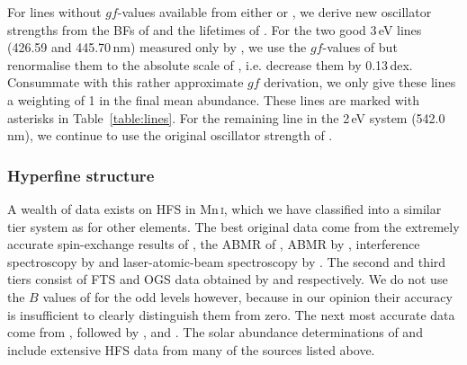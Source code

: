 \documentclass[traditabstract]{aa}
\begin{document}
For lines without $gf$-values available from either \cite{DenHartog11} or \citet{BW07}, we derive new oscillator strengths from the BFs of  and the lifetimes of \citet{Schnabel95}.  For the two good \mbox{3\,eV} lines (426.59 and 445.70\,nm) measured only by \citeauthor{Booth84c}, we use the $gf$-values of \citeauthor{Booth84c} but renormalise them to the absolute scale of \citeauthor{BW07}, i.e. decrease them by 0.13\,dex.  Consummate with this rather approximate $gf$ derivation, we only give these lines a weighting of 1 in the final mean abundance.  These lines are marked with asterisks in Table~\ref{table:lines}.  For the remaining line in the \mbox{2\,eV} system (542.0\,nm), we continue to use the original oscillator strength of \citet{Booth84c}.

\subsubsection{Hyperfine structure}
\label{Mnhfs}

A wealth of data exists on HFS in Mn\,\textsc{i}, which we have classified into a similar tier system as for other elements.
The best original data come from the extremely accurate spin-exchange results of \citet{Davis71}, the ABMR of
\citet{Johann81}, ABMR by \citet{D79}, interference spectroscopy by \citet{B87} and laser-atomic-beam spectroscopy by
\citet{Kronfeldt85}.  The second and third tiers consist of FTS and OGS data obtained by \citet{BW05c} and \citet{Basar03}
respectively.  
We do not use the $B$ values of \citeauthor{Basar03} for the odd levels however, because in our opinion their accuracy is insufficient to clearly distinguish them from zero.
The next most accurate data come from  \citet{Lefebvre03}, followed by \citet{Luc72}, \citet{Handrich69} and \citet{Walther62}.
The solar abundance determinations of \citet{BW07} and \citet{Bergemann07} include extensive HFS data from many of the sources listed
above. 
\end{document}
